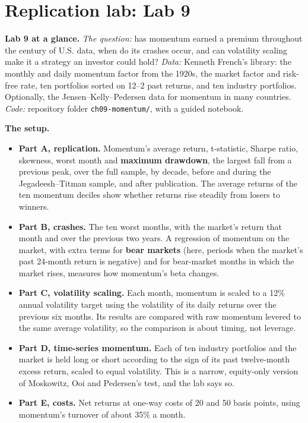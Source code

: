 \section{Replication lab: Lab 9}
\label{sec:09-lab}

\begin{callout}
\textbf{Lab 9 at a glance.} \emph{The question:} has momentum earned a premium throughout the century of U.S. data, when do its crashes occur, and can volatility scaling make it a strategy an investor could hold? \emph{Data:} Kenneth French's library: the monthly and daily momentum factor from the 1920s, the market factor and risk-free rate, ten portfolios sorted on 12--2 past returns, and ten industry portfolios. Optionally, the Jensen--Kelly--Pedersen data for momentum in many countries. \emph{Code:} repository folder \texttt{ch09-momentum/}, with a guided notebook.
\end{callout}

\textbf{The setup.}

\begin{itemize}
  \item \textbf{Part A, replication.} Momentum's average return, t-statistic, Sharpe ratio, skewness, worst month and \textbf{maximum drawdown}, the largest fall from a previous peak, over the full sample, by decade, before and during the Jegadeesh--Titman sample, and after publication. The average returns of the ten momentum deciles show whether returns rise steadily from losers to winners.
  \item \textbf{Part B, crashes.} The ten worst months, with the market's return that month and over the previous two years. A regression of momentum on the market, with extra terms for \textbf{bear markets} (here, periods when the market's past 24-month return is negative) and for bear-market months in which the market rises, measures how momentum's beta changes.
  \item \textbf{Part C, volatility scaling.} Each month, momentum is scaled to a 12\% annual volatility target using the volatility of its daily returns over the previous six months. Its results are compared with raw momentum levered to the same average volatility, so the comparison is about timing, not leverage.
  \item \textbf{Part D, time-series momentum.} Each of ten industry portfolios and the market is held long or short according to the sign of its past twelve-month excess return, scaled to equal volatility. This is a narrow, equity-only version of Moskowitz, Ooi and Pedersen's test, and the lab says so.
  \item \textbf{Part E, costs.} Net returns at one-way costs of 20 and 50 basis points, using momentum's turnover of about 35\% a month.
\end{itemize}

